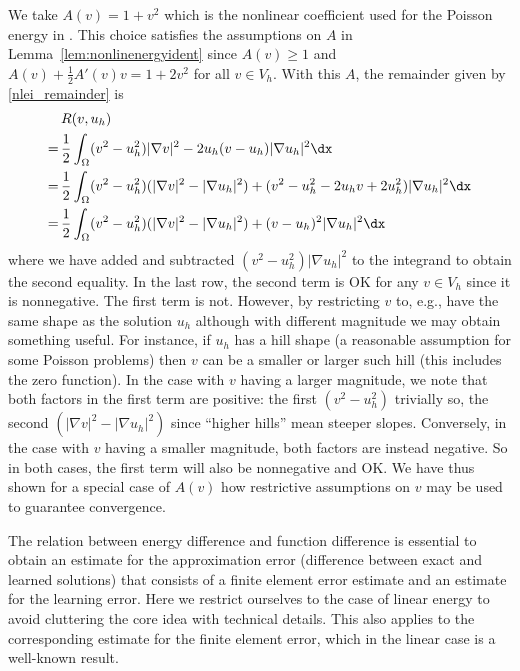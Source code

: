\documentclass[12pt]{article}
\begin{document}
\begin{ex} \label{ex_nonlinen_r}
We take $A(v) = 1 + v^2$ which is the nonlinear coefficient used for the Poisson energy in \cite{BURMAN2025118111}. This choice satisfies the assumptions on $A$ in Lemma~\ref{lem:nonlinenergyident} since $A(v) \geq 1$ and $A(v) + \frac{1}{2}A'(v)v = 1 + 2 v^2$ for all $v \in V_h$. With this $A$, the remainder given by \eqref{nlei_remainder} is
\begin{equation}
\begin{aligned}
& \, R(v, u_h) \\
= & \, \frac{1}{2} \int_{\Omega} (v^2 - u_h^2) | \nabla v |^2 - 2 u_h (v - u_h) | \nabla u_h |^2 \dx \\
= & \, \frac{1}{2} \int_{\Omega} (v^2 - u_h^2) ( | \nabla v |^2 - | \nabla u_h |^2 ) + (v^2 - u_h^2 - 2 u_h v + 2 u_h^2) | \nabla u_h |^2 \dx \\
= & \, \frac{1}{2} \int_{\Omega} (v^2 - u_h^2) ( | \nabla v |^2 - | \nabla u_h |^2 ) + (v - u_h)^2 | \nabla u_h |^2 \dx
\end{aligned}
\end{equation}
where we have added and subtracted $(v^2 - u_h^2) | \nabla u_h |^2$ to the integrand to obtain the second equality. In the last row, the second term is OK for any $v \in V_h$ since it is nonnegative. The first term is not. However, by restricting $v$ to, e.g., have the same shape as the solution $u_h$ although with different magnitude we may obtain something useful. For instance, if $u_h$ has a hill shape (a reasonable assumption for some Poisson problems) then $v$ can be a smaller or larger such hill (this includes the zero function). In the case with $v$ having a larger magnitude, we note that both factors in the first term are positive: the first $(v^2 - u_h^2)$ trivially so, the second $(| \nabla v |^2 - | \nabla u_h |^2)$ since ``higher hills'' mean steeper slopes. Conversely, in the case with $v$ having a smaller magnitude, both factors are instead negative. So in both cases, the first term will also be nonnegative and OK. We have thus shown for a special case of $A(v)$ how restrictive assumptions on $v$ may be used to guarantee convergence.
\end{ex}

The relation between energy difference and function difference is essential to obtain an estimate for the approximation error (difference between exact and learned solutions) that consists of a finite element error estimate and an estimate for the learning error. Here we restrict ourselves to the case of linear energy to avoid cluttering the core idea with technical details. This also applies to the corresponding estimate for the finite element error, which in the linear case is a well-known result.
\end{document}
